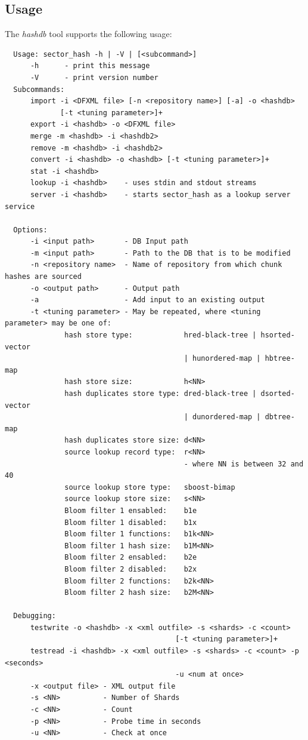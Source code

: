 \documentclass[12pt,twoside]{article}
\newcommand{\hdb}{\emph{hashdb}\xspace}
\begin{document}
\subsection{Usage\label{usage}}
The \hdb tool supports the following usage:
\begin{small}
\begin{verbatim}
  Usage: sector_hash -h | -V | [<subcommand>]
      -h      - print this message
      -V      - print version number
  Subcommands:
      import -i <DFXML file> [-n <repository name>] [-a] -o <hashdb>
             [-t <tuning parameter>]+
      export -i <hashdb> -o <DFXML file>
      merge -m <hashdb> -i <hashdb2>
      remove -m <hashdb> -i <hashdb2>
      convert -i <hashdb> -o <hashdb> [-t <tuning parameter>]+
      stat -i <hashdb>
      lookup -i <hashdb>    - uses stdin and stdout streams
      server -i <hashdb>    - starts sector_hash as a lookup server service

  Options:
      -i <input path>       - DB Input path
      -m <input path>       - Path to the DB that is to be modified
      -n <repository name>  - Name of repository from which chunk hashes are sourced
      -o <output path>      - Output path
      -a                    - Add input to an existing output
      -t <tuning parameter> - May be repeated, where <tuning parameter> may be one of:
              hash store type:            hred-black-tree | hsorted-vector
                                          | hunordered-map | hbtree-map
              hash store size:            h<NN>
              hash duplicates store type: dred-black-tree | dsorted-vector
                                          | dunordered-map | dbtree-map
              hash duplicates store size: d<NN>
              source lookup record type:  r<NN>
                                          - where NN is between 32 and 40
              source lookup store type:   sboost-bimap
              source lookup store size:   s<NN>
              Bloom filter 1 ensabled:    b1e
              Bloom filter 1 disabled:    b1x
              Bloom filter 1 functions:   b1k<NN>
              Bloom filter 1 hash size:   b1M<NN>
              Bloom filter 2 ensabled:    b2e
              Bloom filter 2 disabled:    b2x
              Bloom filter 2 functions:   b2k<NN>
              Bloom filter 2 hash size:   b2M<NN>

  Debugging:
      testwrite -o <hashdb> -x <xml outfile> -s <shards> -c <count>
                                        [-t <tuning parameter>]+
      testread -i <hashdb> -x <xml outfile> -s <shards> -c <count> -p <seconds>
                                        -u <num at once>
      -x <output file> - XML output file
      -s <NN>          - Number of Shards
      -c <NN>          - Count
      -p <NN>          - Probe time in seconds
      -u <NN>          - Check at once
\end{verbatim}
\end{small}
\end{document}

